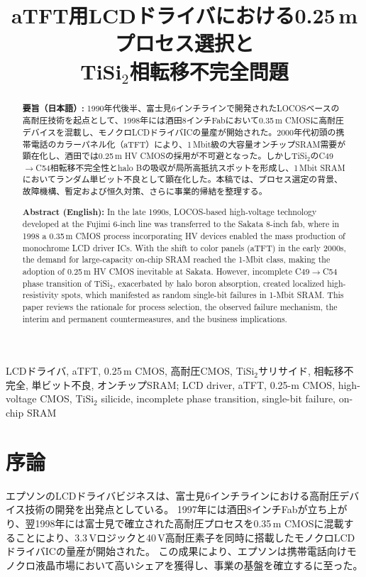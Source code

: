 \documentclass[conference]{IEEEtran}
\title{aTFT用LCDドライバにおける0.25\,\textmu mプロセス選択と\\
TiSi\texorpdfstring{$_2$}{2}相転移不完全問題}
\author{%
  \IEEEauthorblockN{三溝 真一 (Shinichi Samizo)}%
  \IEEEauthorblockA{独立系半導体研究者（元セイコーエプソン）\\%
  Independent Semiconductor Researcher (ex-Seiko Epson)\\%
  Email: \href{mailto:shin3t72@gmail.com}{shin3t72@gmail.com}\\%
  GitHub: \url{https://github.com/Samizo-AITL}}%
}
\begin{document}
\maketitle

\begin{abstract}
\noindent\textbf{要旨（日本語）:}  
1990年代後半、富士見6インチラインで開発されたLOCOSベースの高耐圧技術を起点として、1998年には酒田8インチFabにおいて0.35\,\textmu m CMOSに高耐圧デバイスを混載し、モノクロLCDドライバICの量産が開始された。2000年代初頭の携帯電話のカラーパネル化（aTFT）により、1\,Mbit級の大容量オンチップSRAM需要が顕在化し、酒田では0.25\,\textmu m HV CMOSの採用が不可避となった。しかしTiSi$_2$のC49$\to$C54相転移不完全性とhalo Bの吸収が局所高抵抗スポットを形成し、1\,Mbit SRAMにおいてランダム単ビット不良として顕在化した。本稿では、プロセス選定の背景、故障機構、暫定および恒久対策、さらに事業的帰結を整理する。  

\vspace{1ex}
\noindent\textbf{Abstract (English):}  
In the late 1990s, LOCOS-based high-voltage technology developed at the Fujimi 6-inch line was transferred to the Sakata 8-inch fab, where in 1998 a 0.35\,\textmu m CMOS process incorporating HV devices enabled the mass production of monochrome LCD driver ICs. With the shift to color panels (aTFT) in the early 2000s, the demand for large-capacity on-chip SRAM reached the 1-Mbit class, making the adoption of 0.25\,\textmu m HV CMOS inevitable at Sakata. However, incomplete C49$\to$C54 phase transition of TiSi$_2$, exacerbated by halo boron absorption, created localized high-resistivity spots, which manifested as random single-bit failures in 1-Mbit SRAM. This paper reviews the rationale for process selection, the observed failure mechanism, the interim and permanent countermeasures, and the business implications.
\end{abstract}

\begin{IEEEkeywords}
LCDドライバ, aTFT, 0.25\,\textmu m CMOS, 高耐圧CMOS, TiSi$_2$サリサイド, 相転移不完全, 単ビット不良, オンチップSRAM;
LCD driver, aTFT, 0.25-\textmu m CMOS, high-voltage CMOS, TiSi$_2$ silicide, incomplete phase transition, single-bit failure, on-chip SRAM
\end{IEEEkeywords}

\section{序論}
エプソンのLCDドライバビジネスは、富士見6インチラインにおける高耐圧デバイス技術の開発を出発点としている。  
1997年には酒田8インチFabが立ち上がり、翌1998年には富士見で確立された高耐圧プロセスを0.35\,\textmu m CMOSに混載することにより、3.3\,Vロジックと40\,V高耐圧素子を同時に搭載したモノクロLCDドライバICの量産が開始された。  
この成果により、エプソンは携帯電話向けモノクロ液晶市場において高いシェアを獲得し、事業の基盤を確立するに至った。  
\end{document}
